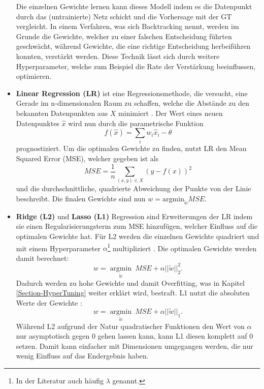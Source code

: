 \begin{itemize}
    Die einzelnen Gewichte lernen kann dieses Modell indem es die Datenpunkt durch das (untrainierte) Netz
    schickt und die Vorhersage mit der GT vergleicht. In einem Verfahren, was sich Backtracking nennt, werden
    im Grunde die Gewichte, welcher zu einer falschen Entscheidung führten geschwächt, während Gewichte, die
    eine richtige Entscheidung herbeiführen konnten, verstärkt werden. Diese Technik lässt sich durch weitere
    Hyperparameter, welche zum Beispiel die Rate der Verstärkung beeinflussen, optimieren.

   \item \textbf{Linear Regression (LR)} ist eine Regressionsmethode, die versucht, eine Gerade im
    n-dimensionalen Raum zu schaffen, welche die Abstände zu den bekannten Datenpunkten aus $X$ minimiert
    \cite{mlLR}. Der Wert eines neuen Datenpunktes $\hat{x}$ wird nun durch die parametrische Funktion
    \begin{equation}
        f(\hat{x}) = \sum_i w_i\hat{x}_i - \theta
    \end{equation}
    prognostiziert. Um die optimalen Gewichte zu finden, nutzt LR den Mean
    Squared Error (MSE), welcher gegeben ist als
    \begin{equation}
        MSE = \frac{1}{n} \sum_{(x,y) \in X}(y-f(x))^2
    \end{equation}
    und die durchschnittliche, quadrierte Abweichung der Punkte von der Linie beschreibt. Die finalen
    Gewichte sind nun $w = \text{argmin}_{\tilde{w}} MSE$.

   \item \textbf{Ridge (L2)} und \textbf{Lasso (L1)} Regression sind Erweiterungen der LR indem sie einen
    Regularisierungsterm zum MSE hinzufügen, welcher Einfluss auf die optimalen Gewichte hat. Für L2 werden
    die einzelnen Gewichte quadriert und mit einem Hyperparameter $\alpha$\footnote{In der Literatur auch
    häufig $\lambda$ genannt.} multipliziert \cite{mlL2}. Die optimalen Gewichte werden
    damit berechnet: 
    \begin{equation}
        w = \underset{\tilde{w}}{\operatorname{argmin}}\ MSE + \alpha||\tilde{w}||_2^2.
    \end{equation}
    Dadurch werden zu hohe Gewichte und damit Overfitting, was in Kapitel \ref{Section-HyperTuning} weiter
    erklärt wird, bestraft. L1 nutzt die absoluten Werte der Gewichte \cite{mlL1}:
    \begin{equation}
        w = \underset{\tilde{w}}{\operatorname{argmin}}\ MSE + \alpha||\tilde{w}||_1.
    \end{equation}
    Während L2 aufgrund der Natur quadratischer Funktionen den Wert von $\alpha$ nur asymptotisch gegen $0$ gehen
    lassen kann, kann L1 diesen komplett auf $0$ setzen. Damit kann einfacher mit Dimensionen umgegangen werden,
    die nur wenig Einfluss auf das Endergebnis haben.

\end{itemize}

